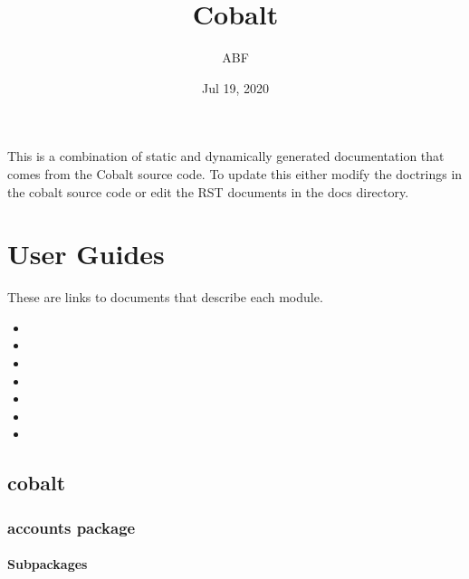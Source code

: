 \documentclass[letterpaper,10pt,english]{sphinxmanual}
\title{Cobalt}
\date{Jul 19, 2020}
\author{ABF}
\let\sphinxpxdimen\pdfpxdimen\else\newdimen\sphinxpxdimen
\begin{document}
\pagestyle{empty}
\sphinxmaketitle
\pagestyle{plain}
\sphinxtableofcontents
\pagestyle{normal}
\label{\detokenize{index::doc}}
\noindent\sphinxincludegraphics[width=300\sphinxpxdimen]{{cobalt}.jpg}



This is a combination of static and dynamically generated documentation that
comes from the Cobalt source code.  To update this either modify the doctrings
in the cobalt source code or edit the RST documents in the docs directory.


\chapter{User Guides}
\label{\detokenize{index:user-guides}}
These are links to documents that describe each module.
\begin{itemize}
\item {} 

\item {} 

\item {} 

\item {} 

\item {} 

\item {} 

\item {} 

\end{itemize}


\section{cobalt}
\label{\detokenize{modules:cobalt}}\label{\detokenize{modules::doc}}

\subsection{accounts package}
\label{\detokenize{accounts:accounts-package}}\label{\detokenize{accounts::doc}}

\subsubsection{Subpackages}
\label{\detokenize{accounts:subpackages}}
\end{document}
